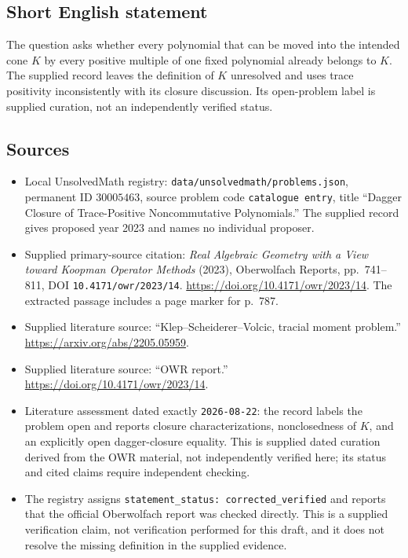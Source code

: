 \documentclass[11pt]{article}
\begin{document}
\subsection{Short English statement}
The question asks whether every polynomial that can be moved into the intended cone \(K\) by every positive multiple of one fixed polynomial already belongs to \(K\). The supplied record leaves the definition of \(K\) unresolved and uses trace positivity inconsistently with its closure discussion. Its open-problem label is supplied curation, not an independently verified status.
\subsection{Sources}
\begin{itemize}
\item Local UnsolvedMath registry: \texttt{data/unsolvedmath/problems.json}, permanent ID \(30005463\), source problem code \texttt{catalogue entry}, title ``Dagger Closure of Trace-Positive Noncommutative Polynomials.'' The supplied record gives proposed year 2023 and names no individual proposer.
\item Supplied primary-source citation: \emph{Real Algebraic Geometry with a View toward Koopman Operator Methods} (2023), Oberwolfach Reports, pp.~741--811, DOI \texttt{10.4171/owr/2023/14}. \url{https://doi.org/10.4171/owr/2023/14}. The extracted passage includes a page marker for p.~787.
\item Supplied literature source: ``Klep--Scheiderer--Volcic, tracial moment problem.'' \url{https://arxiv.org/abs/2205.05959}.
\item Supplied literature source: ``OWR report.'' \url{https://doi.org/10.4171/owr/2023/14}.
\item Literature assessment dated exactly \texttt{2026-08-22}: the record labels the problem open and reports closure characterizations, nonclosedness of \(K\), and an explicitly open dagger-closure equality. This is supplied dated curation derived from the OWR material, not independently verified here; its status and cited claims require independent checking.
\item The registry assigns \texttt{statement\_status: corrected\_verified} and reports that the official Oberwolfach report was checked directly. This is a supplied verification claim, not verification performed for this draft, and it does not resolve the missing definition in the supplied evidence.
\end{itemize}
\end{document}

